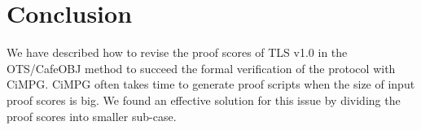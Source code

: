 \documentclass[a4paper,fleqn]{cas-dc}
\begin{document}
\section{Conclusion}\label{conclusion}
We have described how to revise the proof scores of TLS v1.0 in the OTS/CafeOBJ method to succeed the formal verification of the protocol with CiMPG. CiMPG often takes time to generate proof scripts when the size of input
proof scores is big. We found an effective solution for this issue by dividing the proof scores into smaller sub-case.












\end{document}
